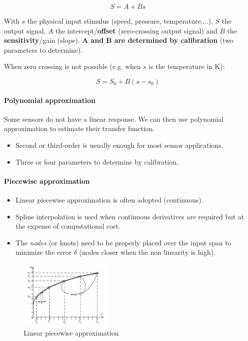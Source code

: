 $$ S = A + Bs $$

With $s$ the physical input stimulus (speed, pressure, temperature,...), $S$ the output signal, $A$ the intercept/\textbf{offset} (zero-crossing output signal) and $B$ the \textbf{sensitivity}/gain (slope).\textbf{ A and B are determined by calibration} (two parameters to determine).

When zero crossing is not possible (e.g. when $s$ is the temperature in K):

$$ S = S_0 + B(s-s_0) $$

\paragraph{Polynomial approximation}

Some sensors do not have a linear response. We can then use polynomial approximation to estimate their transfer function.

\begin{itemize}
    \item Second or third-order is usually enough for most sensor applications.
    \item Three or four parameters to determine by calibration.
\end{itemize}

\paragraph{Piecewise approximation}

\begin{itemize}
   \item Linear piecewise approximation is often adopted (continuous).
    \item Spline interpolation is used when continuous derivatives are required but at the expense of computational cost.
    \item The \textit{nodes} (or knots) need to be properly placed over the input span to minimize the error $\delta$ (nodes closer when the non linearity is high).
\end{itemize}

\begin{figure}[H]
    \centering
    \includegraphics[width = 0.4\textwidth]{L1/img/piecewise.PNG}
    \caption{Linear piecewise approximation}
    \label{fig:piecewise}
\end{figure}

